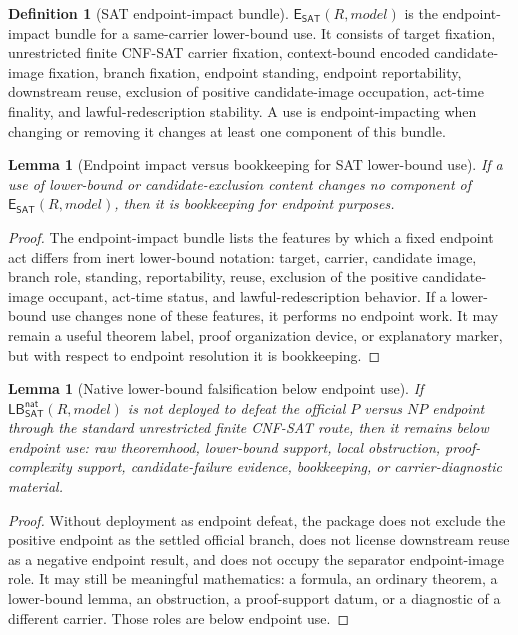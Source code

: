 \documentclass[11pt]{article}
\newtheorem{lemma}[theorem]{Lemma}
\theoremstyle{definition}
\newtheorem{definition}[theorem]{Definition}
\theoremstyle{remark}
\newcommand{\LBNatSAT}{\mathsf{LB}^{\mathsf{nat}}_{\mathsf{SAT}}}
\newcommand{\EndpointImpactSAT}{\mathsf{E}_{\mathsf{SAT}}}
\begin{document}
\begin{definition}[SAT endpoint-impact bundle]\label{def:sat-endpoint-impact-bundle}
\(\EndpointImpactSAT(R,model)\) is the endpoint-impact bundle for a same-carrier lower-bound use. It consists of target fixation, unrestricted finite CNF-SAT carrier fixation, context-bound encoded candidate-image fixation, branch fixation, endpoint standing, endpoint reportability, downstream reuse, exclusion of positive candidate-image occupation, act-time finality, and lawful-redescription stability. A use is endpoint-impacting when changing or removing it changes at least one component of this bundle.
\end{definition}

\begin{lemma}[Endpoint impact versus bookkeeping for SAT lower-bound use]\label{lem:sat-lb-endpoint-impact-vs-bookkeeping}
If a use of lower-bound or candidate-exclusion content changes no component of \(\EndpointImpactSAT(R,model)\), then it is bookkeeping for endpoint purposes.
\end{lemma}

\begin{proof}
The endpoint-impact bundle lists the features by which a fixed endpoint act differs from inert lower-bound notation: target, carrier, candidate image, branch role, standing, reportability, reuse, exclusion of the positive candidate-image occupant, act-time status, and lawful-redescription behavior. If a lower-bound use changes none of these features, it performs no endpoint work. It may remain a useful theorem label, proof organization device, or explanatory marker, but with respect to endpoint resolution it is bookkeeping.
\end{proof}

\begin{lemma}[Native lower-bound falsification below endpoint use]\label{lem:native-lb-below-endpoint-use}
If \(\LBNatSAT(R,model)\) is not deployed to defeat the official \(P\) versus \(NP\) endpoint through the standard unrestricted finite CNF-SAT route, then it remains below endpoint use: raw theoremhood, lower-bound support, local obstruction, proof-complexity support, candidate-failure evidence, bookkeeping, or carrier-diagnostic material.
\end{lemma}

\begin{proof}
Without deployment as endpoint defeat, the package does not exclude the positive endpoint as the settled official branch, does not license downstream reuse as a negative endpoint result, and does not occupy the separator endpoint-image role. It may still be meaningful mathematics: a formula, an ordinary theorem, a lower-bound lemma, an obstruction, a proof-support datum, or a diagnostic of a different carrier. Those roles are below endpoint use.
\end{proof}
\end{document}
